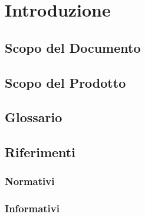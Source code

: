 \section{Introduzione}
\subsection{Scopo del Documento}
	
\subsection{Scopo del Prodotto}

\subsection{Glossario}
	
\subsection{Riferimenti}

	\subsubsection{Normativi}
		
	
	\subsubsection{Informativi}
